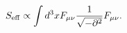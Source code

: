 \begin{equation}
\label{anomMaxwell}
S_{\rm eff}\propto\int d^3xF_{\mu\nu}\frac{1}{\sqrt{
-\partial^2}}F_{\mu\nu}.
\end{equation}

